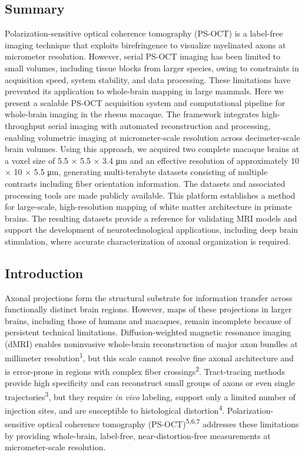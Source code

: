 \documentclass{article}
\begin{document}
\subsection*{Summary}

Polarization-sensitive optical coherence tomography (PS-OCT) is a label-free imaging technique that exploits birefringence to visualize myelinated axons at micrometer resolution. However, serial PS-OCT imaging has been limited to small volumes, including tissue blocks from larger species, owing to constraints in acquisition speed, system stability, and data processing. These limitations have prevented its application to whole-brain mapping in large mammals. Here we present a scalable PS-OCT acquisition system and computational pipeline for whole-brain imaging in the rhesus macaque. The framework integrates high-throughput serial imaging with automated reconstruction and processing, enabling volumetric imaging at micrometer-scale resolution across decimeter-scale brain volumes. Using this approach, we acquired two complete macaque brains at a voxel size of 5.5 × 5.5 × 3.4 μm and an effective resolution of approximately 10 × 10 × 5.5 μm, generating multi-terabyte datasets consisting of multiple contrasts including fiber orientation information. The datasets and associated processing tools are made publicly available. This platform establishes a method for large-scale, high-resolution mapping of white matter architecture in primate brains. The resulting datasets provide a reference for validating MRI models and support the development of neurotechnological applications, including deep brain stimulation, where accurate characterization of axonal organization is required.

\subsection*{Introduction}

Axonal projections form the structural substrate for information transfer across functionally distinct brain regions. However, maps of these projections in larger brains, including those of humans and macaques, remain incomplete because of persistent technical limitations. Diffusion-weighted magnetic resonance imaging (dMRI) enables noninvasive whole-brain reconstruction of major axon bundles at millimeter resolution\textsuperscript{1}, but this scale cannot resolve fine axonal architecture and is error-prone in regions with complex fiber crossings\textsuperscript{2}. Tract-tracing methods provide high specificity and can reconstruct small groups of axons or even single trajectories\textsuperscript{3}, but they require \emph{in vivo} labeling, support only a limited number of injection sites, and are susceptible to histological distortion\textsuperscript{4}. Polarization-sensitive optical coherence tomography (PS-OCT)\textsuperscript{5,6,7} addresses these limitations by providing whole-brain, label-free, near-distortion-free measurements at micrometer-scale resolution.
\end{document}
